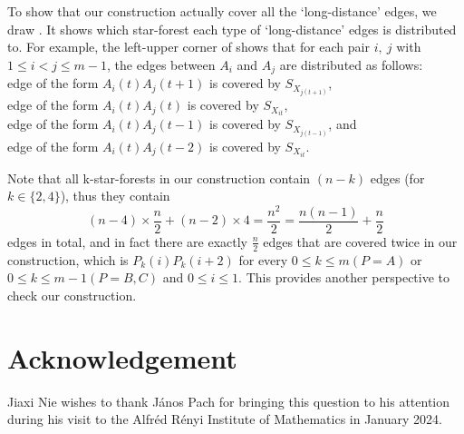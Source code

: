 \documentclass{article}
\begin{document}
 To show that our construction actually cover all the `long-distance' edges, we draw . It shows which star-forest each type of `long-distance' edges is distributed to. For example, the left-upper corner of  shows that for each pair $i,~j$ with $1\le i< j\le m-1$, the edges between $A_i$ and $A_j$ are distributed as follows: \\
 \indent edge of the form $A_i(t)A_j(t+1)$ is covered by $S_{X_{j(t+1)}}$,\\
 \indent edge of the form $A_i(t)A_j(t)$ is covered by $S_{X_{it}}$,\\
 \indent edge of the form $A_i(t)A_j(t-1)$ is covered by $S_{X_{j(t-1)}}$, and\\
 \indent edge of the form $A_i(t)A_j(t-2)$ is covered by $S_{X_{it}}$.
	
Note that all k-star-forests in our construction contain $(n-k)$ edges (for $k\in \{2,4\}$), thus they contain
$$
(n-4)\times\frac{n}{2}+(n-2)\times4=\frac{n^2}{2}=\frac{n(n-1)}{2}+\frac{n}{2}
$$
edges in total, and in fact there are exactly $\frac{n}{2}$ edges that are covered twice in our construction, which is $P_k(i)P_k(i+2)$ for every $0\le k\le m(P=A)$ or $0\le k\le m-1(P=B,C) $ and $0\le i\le 1$. This provides another perspective to check our construction.
	
\section*{Acknowledgement}

Jiaxi Nie wishes to thank János Pach for bringing this question to his attention during his visit to the Alfréd Rényi Institute of Mathematics in January 2024.



\end{document}
